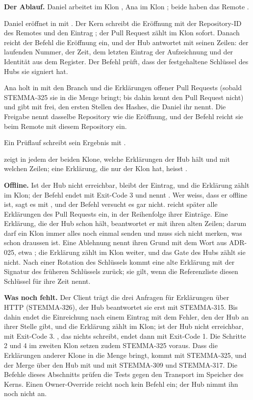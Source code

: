 {\bf Der Ablauf.}
Daniel arbeitet im Klon , Ana im Klon ; beide haben das Remote .

\startitemize[n]
\item Daniel eröffnet in  mit . Der Kern schreibt die
Eröffnung mit der Repository-ID des Remotes und den Eintrag ; der Pull Request
zählt im Klon sofort. Danach reicht der Befehl die Eröffnung ein, und der Hub antwortet mit
seinen Zeilen: der laufenden Nummer, der Zeit, dem letzten Eintrag der Aufzeichnung und der
Identität aus dem Register. Der Befehl prüft, dass der festgehaltene Schlüssel des Hubs sie
signiert hat.
\item Ana holt in  mit  den Branch und die Erklärungen offener Pull Requests
(sobald STEMMA-325 sie in die Menge bringt; bis dahin kennt  den Pull Request nicht)
und gibt mit  frei, den ersten Stellen des Hashes, die Daniel ihr
nennt. Die Freigabe nennt dasselbe Repository wie die Eröffnung, und der Befehl reicht sie beim
Remote mit diesem Repository ein.
\item Ein Prüflauf schreibt sein Ergebnis mit .
\item {} zeigt in jedem der beiden Klone, welche Erklärungen
der Hub hält und mit welchen Zeilen; eine Erklärung, die nur der Klon hat, heisst
.
\stopitemize

{\bf Offline.}
Ist der Hub nicht erreichbar, bleibt der Eintrag, und die Erklärung zählt im Klon; der Befehl
endet mit Exit-Code 3 und nennt . Wer weiss, dass er offline ist, sagt es
mit , und der Befehl versucht es gar nicht.
 reicht später alle Erklärungen des Pull Requests ein, in der Reihenfolge ihrer
Einträge. Eine Erklärung, die der Hub schon hält, beantwortet er mit ihren alten Zeilen; darum
darf ein Klon immer alles noch einmal senden und muss sich nicht merken, was schon draussen ist.
Eine Ablehnung nennt ihren Grund mit dem Wort aus ADR-025, etwa ; die
Erklärung zählt im Klon weiter, und das Gate des Hubs zählt sie nicht.
Nach einer Rotation des Schlüssels kommt eine alte Erklärung mit der Signatur des früheren
Schlüssels zurück; sie gilt, wenn die Referenzliste diesen Schlüssel für ihre Zeit nennt.

\startinfobox
{\bf Was noch fehlt.}
Der Client trägt die drei Anfragen für Erklärungen über HTTP (STEMMA-326), der Hub beantwortet
sie erst mit STEMMA-315.
Bis dahin endet die Einreichung nach einem Eintrag mit dem Fehler, den der Hub an ihrer Stelle
gibt, und die Erklärung zählt im Klon; ist der Hub nicht erreichbar, mit Exit-Code 3.
, das nichts schreibt, endet dann mit Exit-Code 1.
Die Schritte 2 und 4 im zweiten Klon setzen zudem STEMMA-325 voraus. Dass  die
Erklärungen anderer Klone in die Menge bringt, kommt mit STEMMA-325, und der Merge über den Hub
mit  und  mit STEMMA-309 und STEMMA-317. Die Befehle dieses Abschnitts
prüfen die Tests gegen den Transport im Speicher des Kerns. Einen Owner-Override reicht noch
kein Befehl ein; der Hub nimmt ihn noch nicht an.
\stopinfobox

